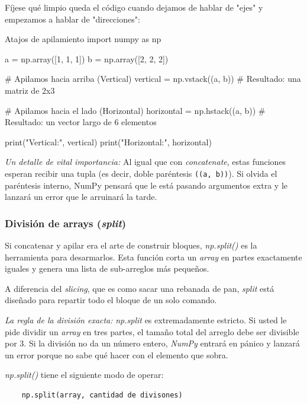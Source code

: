 Fíjese qué limpio queda el código cuando dejamos de hablar de "ejes" y empezamos a hablar de "direcciones":

\begin{pycode}{Atajos de apilamiento}
import numpy as np

a = np.array([1, 1, 1])
b = np.array([2, 2, 2])

# Apilamos hacia arriba (Vertical)
vertical = np.vstack((a, b)) # Resultado: una matriz de 2x3

# Apilamos hacia el lado (Horizontal)
horizontal = np.hstack((a, b)) # Resultado: un vector largo de 6 elementos

print("Vertical:\n", vertical)
print("Horizontal:", horizontal)
\end{pycode}

\begin{nota}
    \textit{Un detalle de vital importancia:} Al igual que con \textit{concatenate}, estas funciones esperan recibir una tupla (es decir, doble paréntesis \texttt{((a, b))}). Si olvida el paréntesis interno, NumPy pensará que le está pasando argumentos extra y le lanzará un error que le arruinará la tarde.
\end{nota}




\subsubsection{División de arrays (\textit{split})}

Si concatenar y apilar era el arte de construir bloques, \textit{np.split()} es la herramienta para desarmarlos. Esta función corta un \textit{array} en partes exactamente iguales y genera una lista de sub-arreglos más pequeños.

A diferencia del \textit{slicing}, que es como sacar una rebanada de pan, \textit{split} está diseñado para repartir todo el bloque de un solo comando.

\begin{nota}
    \textit{La regla de la división exacta:} \textit{np.split} es extremadamente estricto. Si usted le pide dividir un \textit{array} en tres partes, el tamaño total del arreglo debe ser divisible por 3. Si la división no da un número entero, \textit{NumPy} entrará en pánico y lanzará un error porque no sabe qué hacer con el elemento que sobra. 
\end{nota}

\textit{np.split()} tiene el siguiente modo de operar:
\begin{verbatim}
    np.split(array, cantidad de divisones)
\end{verbatim}

